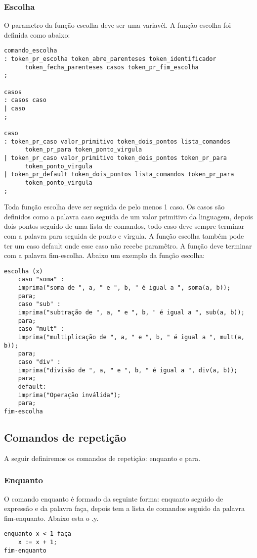 \documentclass[a4paper,10pt]{article}
\begin{document}
\subsubsection{Escolha}

O parametro da função escolha deve ser uma variavél. A função escolha foi definida como abaixo:


\begin{verbatim}
comando_escolha
: token_pr_escolha token_abre_parenteses token_identificador 
      token_fecha_parenteses casos token_pr_fim_escolha
;

casos
: casos caso
| caso
;

caso
: token_pr_caso valor_primitivo token_dois_pontos lista_comandos 
      token_pr_para token_ponto_virgula
| token_pr_caso valor_primitivo token_dois_pontos token_pr_para 
      token_ponto_virgula
| token_pr_default token_dois_pontos lista_comandos token_pr_para 
      token_ponto_virgula
;
\end{verbatim}
Toda função escolha deve ser seguida de pelo menos 1 caso. Os casos são definidos como a palavra caso seguida de um valor primitivo da linguagem, depois dois pontos seguido de uma lista de comandos, todo caso deve sempre terminar com a palavra para seguida de ponto e virgula. A função escolha também pode ter um caso default onde esse caso não recebe paramêtro. A função deve terminar com a palavra fim-escolha.
Abaixo um exemplo da função escolha:
\begin{verbatim}
escolha (x)
    caso "soma" :
	imprima("soma de ", a, " e ", b, " é igual a ", soma(a, b));
	para;
    caso "sub" :
	imprima("subtração de ", a, " e ", b, " é igual a ", sub(a, b));
	para;
    caso "mult" :
	imprima("multiplicação de ", a, " e ", b, " é igual a ", mult(a, b));
	para;
    caso "div" :
	imprima("divisão de ", a, " e ", b, " é igual a ", div(a, b));
	para;
    default:
	imprima("Operação inválida");
	para;
fim-escolha
\end{verbatim}


\subsection{Comandos de repetição}
A seguir definiremos os comandos de repetição: enquanto e para.

\subsubsection{Enquanto}

O comando enquanto é formado da seguinte forma: enquanto seguido de expressão e da palavra faça, depois tem a lista de comandos seguido da palavra fim-enquanto. Abaixo esta o .y.
\begin{verbatim}
enquanto x < 1 faça
    x := x + 1;
fim-enquanto
\end{verbatim}
\end{document}
